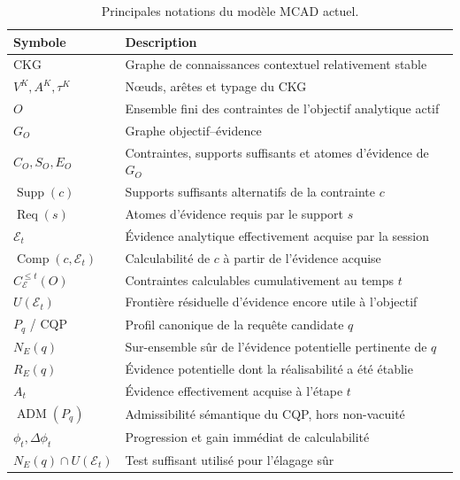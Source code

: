 \begin{table}[!t]
\centering
\caption{Principales notations du modèle MCAD actuel.}
\scriptsize
\begin{tabularx}{\columnwidth}{@{}p{2.35cm}X@{}}
\toprule
Symbole & Description \\
\midrule
$\mathrm{CKG}$ & Graphe de connaissances contextuel relativement stable \\
$V^{K},A^{K},\tau^{K}$ & Nœuds, arêtes et typage du CKG \\
$O$ & Ensemble fini des contraintes de l'objectif analytique actif \\
$G_O$ & Graphe objectif--évidence \\
$C_O,S_O,E_O$ & Contraintes, supports suffisants et atomes d'évidence de $G_O$ \\
$\operatorname{Supp}(c)$ & Supports suffisants alternatifs de la contrainte $c$ \\
$\operatorname{Req}(s)$ & Atomes d'évidence requis par le support $s$ \\
$\mathcal{E}_t$ & Évidence analytique effectivement acquise par la session \\
$\operatorname{Comp}(c,\mathcal{E}_t)$ & Calculabilité de $c$ à partir de l'évidence acquise \\
$C_{\mathcal{E}}^{\le t}(O)$ & Contraintes calculables cumulativement au temps $t$ \\
$U(\mathcal{E}_t)$ & Frontière résiduelle d'évidence encore utile à l'objectif \\
$P_q$ / CQP & Profil canonique de la requête candidate $q$ \\
$N_E(q)$ & Sur-ensemble sûr de l'évidence potentielle pertinente de $q$ \\
$R_E(q)$ & Évidence potentielle dont la réalisabilité a été établie \\
$A_t$ & Évidence effectivement acquise à l'étape $t$ \\
$\operatorname{ADM}(P_q)$ & Admissibilité sémantique du CQP, hors non-vacuité \\
$\phi_t,\Delta\phi_t$ & Progression et gain immédiat de calculabilité \\
$N_E(q)\cap U(\mathcal{E}_t)$ & Test suffisant utilisé pour l'élagage sûr \\
\bottomrule
\end{tabularx}
\label{tab:notation}
\normalsize
\end{table}
